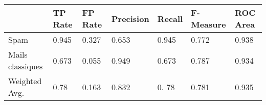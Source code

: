\begin{tabular}{l|l|l|l|l|l|l}
                   & TP Rate   & FP Rate   & Precision    &Recall  & F-Measure   &ROC  Area   \\
\hline
Spam              &  0.945    & 0.327      &0.653   &  0.945     &0.772      &0.938     \\
\hline
Mails classiques & 0.673     & 0.055      &0.949     & 0.673     &0.787      & 0.934   \\
\hline
Weighted Avg.    & 0.78      & 0.163      &0.832     &0. 78     & 0.781      & 0.935 \\
\end{tabular}
